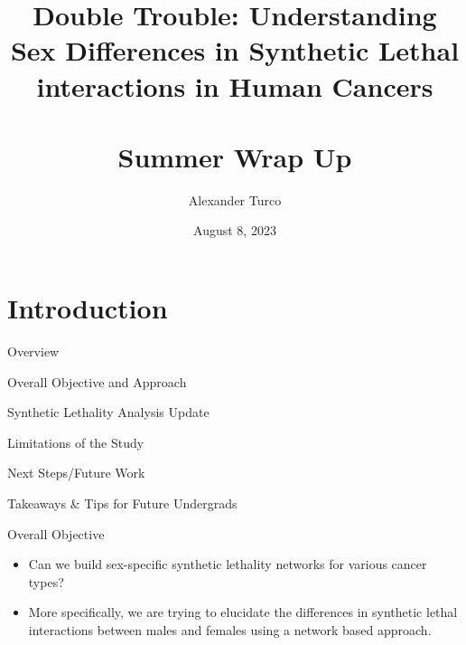 \documentclass{beamer}
\title[BEAP Dec 2022]{Double Trouble: Understanding Sex Differences in Synthetic Lethal interactions in Human Cancers \\~\\ Summer Wrap Up}
\author{Alexander Turco}
\date{August 8, 2023}
\begin{document}
	
	\section{Introduction}
	\begin{frame}
		\titlepage 
		\begin{center}
		\end{center}
	\end{frame}
	
	\logo{}
	
	\begin{frame}{Overview}
		
		\begin{center}
		\begin{minipage}{6cm}
				
		  		\begin{block}{} Overall Objective and Approach \end{block}
		  		\begin{block}{} Synthetic Lethality Analysis Update \end{block}
		  		\begin{block}{} Limitations of the Study \end{block}
		  		\begin{block}{} Next Steps/Future Work \end{block}
		  		\begin{block}{} Takeaways \& Tips for Future Undergrads \end{block}

		\end{minipage}
		\end{center}
	
	\end{frame}
	
	
	\begin{frame}{Overall Objective}
		\begin{itemize}
			\item Can we build sex-specific synthetic lethality networks for various cancer types? \newline
			
			\item More specifically, we are trying to elucidate the differences in synthetic lethal interactions between males and females using a network based approach.
		\end{itemize}
	\end{frame}
\end{document}

